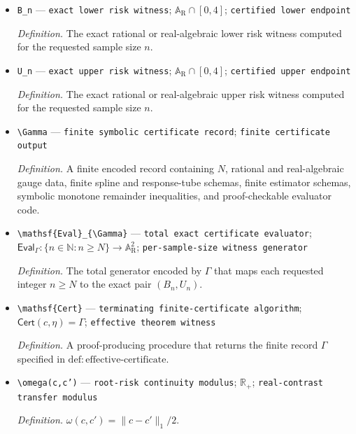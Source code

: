 \documentclass{article}
\begin{document}
\begin{itemize}
  \item \texttt{B\_\allowbreak{}n} --- \texttt{exact lower risk witness}; \(\mathbb A_{\mathrm R}\cap[0,4]\); \texttt{certified lower endpoint}
  \par\smallskip\noindent\emph{Definition.} The exact rational or real-algebraic lower risk witness computed for the requested sample size \(n\).
  \item \texttt{U\_\allowbreak{}n} --- \texttt{exact upper risk witness}; \(\mathbb A_{\mathrm R}\cap[0,4]\); \texttt{certified upper endpoint}
  \par\smallskip\noindent\emph{Definition.} The exact rational or real-algebraic upper risk witness computed for the requested sample size \(n\).
  \item \texttt{\textbackslash{}\allowbreak{}Gamma} --- \texttt{finite symbolic certificate record}; \texttt{finite certificate output}
  \par\smallskip\noindent\emph{Definition.} A finite encoded record containing \(N\), rational and real-algebraic gauge data, finite spline and response-tube schemas, finite estimator schemas, symbolic monotone remainder inequalities, and proof-checkable evaluator code.
  \item \texttt{\textbackslash{}\allowbreak{}mathsf\{Eval\}\allowbreak{}\_\allowbreak{}\{\textbackslash{}\allowbreak{}Gamma\}\allowbreak{}} --- \texttt{total exact certificate evaluator}; \(\mathsf{Eval}_{\Gamma}:\{n\in\mathbb N:n\ge N\}\to\mathbb A_{\mathrm R}^2\); \texttt{per-\allowbreak{}sample-\allowbreak{}size witness generator}
  \par\smallskip\noindent\emph{Definition.} The total generator encoded by \(\Gamma\) that maps each requested integer \(n\ge N\) to the exact pair \((B_n,U_n)\).
  \item \texttt{\textbackslash{}\allowbreak{}mathsf\{Cert\}\allowbreak{}} --- \texttt{terminating finite-\allowbreak{}certificate algorithm}; \(\mathsf{Cert}(c,\eta)=\Gamma\); \texttt{effective theorem witness}
  \par\smallskip\noindent\emph{Definition.} A proof-producing procedure that returns the finite record \(\Gamma\) specified in \(\mathrm{def:effective\text{-}certificate}\).
  \item \texttt{\textbackslash{}\allowbreak{}omega(c,\allowbreak{}c')} --- \texttt{root-\allowbreak{}risk continuity modulus}; \(\mathbb R_+\); \texttt{real-\allowbreak{}contrast transfer modulus}
  \par\smallskip\noindent\emph{Definition.} \(\omega(c,c')=\|c-c'\|_1/2\).

\end{itemize}
\end{document}
